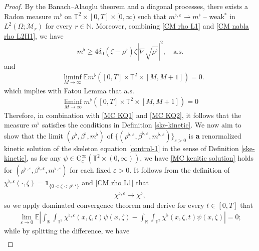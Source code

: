 \begin{proof}
By the Banach--Alaoglu theorem and a diagonal processes, there exists a Radon measure $m^{\flat}$ on $\mathbb{T}^2\times [0,T]\times [0,\infty)$ such that $m^{\flat,\varepsilon}\rightharpoonup m^{\flat}$ -- weak${}^{\ast}$ in $L^2(\Omega; \mathcal{M}_r)$ for every $r\in \mathbb{N}$. Moreover, combining \eqref{CM rho L1} and \eqref{CM nabla rho L2H1},  we have
\begin{equation}\label{MC KQ1}
  m^{\flat} \geq 4\delta_0(\zeta - \rho^{\flat})\zeta|\nabla\sqrt{\rho^{\flat}}|^2,\quad \text{a.s.}
\end{equation}
 and
\begin{align*}
  &\liminf _{M \rightarrow \infty} \mathbb{E} m^{\flat}\left([0, T] \times \mathbb{T}^2 \times[M, M+1]\right)=0.
\end{align*}
which implies with Fatou Lemma that a.s.
\begin{align}\label{MC KQ2}
\liminf _{M \rightarrow \infty}  m^{\flat}\left([0, T] \times \mathbb{T}^2 \times[M, M+1]\right)=0
\end{align}
Therefore, in combination with \eqref{MC KQ1} and \eqref{MC KQ2},  it follows that the measure $m^{\flat}$ satisfies the conditions in Definition \ref{ske-kinetic}. We now aim to show that the limit $(\rho^{\flat},\beta^{\flat},m^{\flat})$ of $\{(\rho^{\flat,\varepsilon},\beta^{\flat,\varepsilon},m^{\flat,\varepsilon})\}_{\varepsilon > 0}$ is \textbf{a} renormalized kinetic solution of the skeleton equation \eqref{control-1} in the sense of Definition \ref{ske-kinetic}, as for any $\psi \in \mathrm{C}_{c}^{\infty}\left(\mathbb{T}^2 \times(0, \infty)\right)$, we have \eqref{MC kenitic solution} holds for $(\rho^{\flat,\varepsilon},\beta^{\flat,\varepsilon},m^{\flat,\varepsilon})$ for each fixed $\varepsilon > 0$. It follows from the definition of $\chi^{\flat,\varepsilon}(\cdot, \zeta) = \mathbf{1}_{\{0 < \zeta < \rho^{\flat,\varepsilon}\}}$ and \eqref{CM rho L1} that
\begin{align*}
\chi^{\flat,\varepsilon} \to \chi^{\flat}, 
\end{align*}
so we apply dominated convergence theorem and derive for every $t \in [0,T]$ that
%
\begin{align}\label{MC K P}
\lim_{\varepsilon\to 0} \mathbb{E}\left|\int_{\mathbb{R}}\int_{\mathbb{T}^2}\chi^{\flat,\varepsilon}(x,\zeta,t)\psi(x,\zeta)
-\int_{\mathbb{R}}\int_{\mathbb{T}^2} \chi^{\flat}(x,\zeta,t)\psi(x,\zeta)\right| = 0;
\end{align}
%
while by splitting the difference, we have
\begin{align}\label{b lap}

\end{align}
\end{proof}
